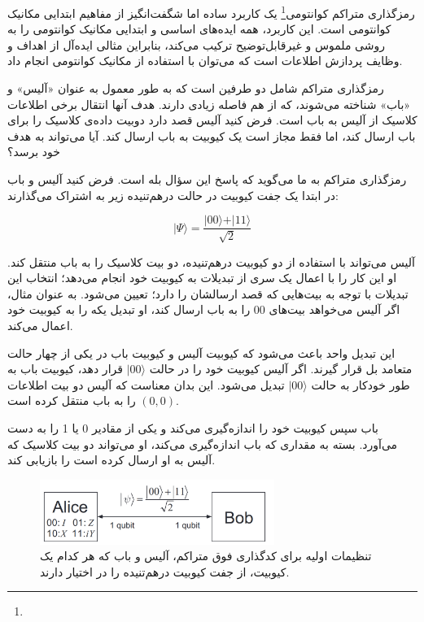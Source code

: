 \documentclass{book}
\begin{document}
رمزگذاری متراکم کوانتومی\footnote{} یک کاربرد ساده اما شگفت‌انگیز از مفاهیم ابتدایی مکانیک کوانتومی است. این کاربرد، همه ایده‌های اساسی و ابتدایی مکانیک کوانتومی را به روشی ملموس و غیرقابل‌توضیح ترکیب می‌کند، بنابراین مثالی ایده‌آل از اهداف و وظایف پردازش اطلاعات است که می‌توان با استفاده از مکانیک کوانتومی انجام داد.

رمزگذاری متراکم شامل دو طرفین است که به طور معمول به عنوان «آلیس» و «باب» شناخته می‌شوند، که از هم فاصله زیادی دارند. هدف آنها انتقال برخی اطلاعات کلاسیک از آلیس به باب است. فرض کنید آلیس قصد دارد دوبیت داده‌ی کلاسیک را برای باب ارسال کند، اما فقط مجاز است یک کیوبیت به باب ارسال کند. آیا می‌تواند به هدف خود برسد؟

رمزگذاری متراکم به ما می‌گوید که پاسخ این سؤال بله است. فرض کنید آلیس و باب در ابتدا یک جفت کیوبیت در حالت درهم‌تنیده زیر به اشتراک می‌گذارند:
\begin{center}
	\begin{equation}\label{entangel psi}
		\vert \Psi \rangle = \frac{\vert 00 \rangle + \vert 11\rangle}{\sqrt{2}}
	\end{equation}
	
\end{center}


آلیس می‌تواند با استفاده از دو کیوبیت درهم‌تنیده، دو بیت کلاسیک را به باب منتقل کند. او این کار را با اعمال یک سری از تبدیلات به کیوبیت خود انجام می‌دهد؛ انتخاب این تبدیلات با توجه به بیت‌هایی که قصد ارسالشان را دارد؛‌ تعیین می‌شود.  به عنوان مثال، اگر آلیس می‌خواهد بیت‌های 00 را به باب ارسال کند، او تبدیل یکه را به کیوبیت خود اعمال می‌کند.

این تبدیل واحد باعث می‌شود که کیوبیت آلیس و کیوبیت باب در یکی از چهار حالت متعامد بل قرار گیرند. اگر آلیس کیوبیت خود را در حالت $\vert 00 \rangle$ قرار دهد، کیوبیت باب به طور خودکار به حالت $\vert 00 \rangle$ تبدیل می‌شود. این بدان معناست که آلیس دو بیت اطلاعات $(0, 0)$ را به باب منتقل کرده است.

باب سپس کیوبیت خود را اندازه‌گیری می‌کند و یکی از مقادیر 0 یا 1 را به دست می‌آورد. بسته به مقداری که باب اندازه‌گیری می‌کند، او می‌تواند دو بیت کلاسیک که آلیس به او ارسال کرده است را بازیابی کند.
\pagebreak

\begin{center}
	\begin{figure}[htbp]
		\centering
		\includegraphics[width=3in]{super dence.png}
		\caption{تنظیمات اولیه برای کدگذاری فوق متراکم، آلیس و باب که هر کدام یک کیوبیت، از جفت کیوبیت درهم‌تنیده را در اختیار دارند.}
		\label{fig:myimage}
	\end{figure}
\end{center}
\end{document}
